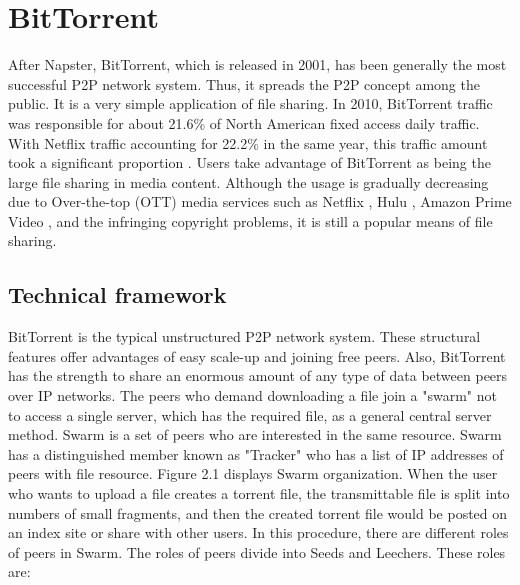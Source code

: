 \section{BitTorrent}

After Napster, BitTorrent, which is released in 2001, has been generally the most successful P2P network system. Thus, it spreads the P2P concept among the public. It is a very simple application of file sharing. In 2010, BitTorrent traffic was responsible for about 21.6\% of North American fixed access daily traffic. With Netflix traffic accounting for 22.2\% in the same year, this traffic amount took a significant proportion \cite{sandvine}. Users take advantage of BitTorrent as being the large file sharing in media content. Although the usage is gradually decreasing due to Over-the-top (OTT) media services such as Netflix \cite{netflix}, Hulu \cite{hulu}, Amazon Prime Video \cite{amazon}, and the infringing copyright problems, it is still a popular means of file sharing.

\subsection{Technical framework}

BitTorrent is the typical unstructured P2P network system. These structural features offer advantages of easy scale-up and joining free peers. Also, BitTorrent has the strength to share an enormous amount of any type of data between peers over IP networks. The peers who demand downloading a file join a "swarm" not to access a single server, which has the required file, as a general central server method. Swarm is a set of peers who are interested in the same resource. Swarm has a distinguished member known as "Tracker" who has a list of IP addresses of peers with file resource. Figure 2.1 displays Swarm organization. When the user who wants to upload a file creates a torrent file, the transmittable file is split into numbers of small fragments, and then the created torrent file would be posted on an index site or share with other users. In this procedure, there are different roles of peers in Swarm. The roles of peers divide into Seeds and Leechers. These roles are:

